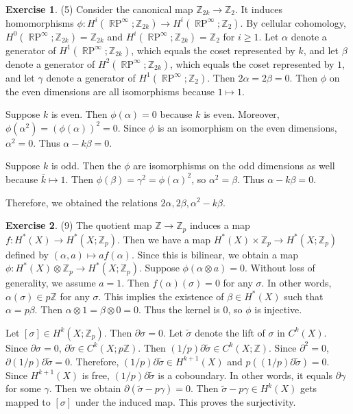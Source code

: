 \documentclass[12pt, psamsfonts]{amsart}
\theoremstyle{definition}
\newtheorem*{exer}{Exercise}
\theoremstyle{remark}
\DeclareMathOperator{\RP}{\mathbb{R}P}
\numberwithin{equation}{section}
\begin{document}
\begin{exer}{(5)}
  Consider the canonical map $\mathbb{Z}_{2k} \rightarrow \mathbb{Z}_2$.
  It induces homomorphisms $\phi: H^i(\RP^{\infty};\mathbb{Z}_{2k}) \rightarrow H^i(\RP^{\infty};\mathbb{Z}_{2})$.
  By cellular cohomology, $H^0(\RP^{\infty}; \mathbb{Z}_{2k}) = \mathbb{Z}_{2k}$ and $H^i(\RP^{\infty}; \mathbb{Z}_{2k}) = \mathbb{Z}_2$ for $i \geq 1$.
  Let $\alpha$ denote a generator of $H^1(\RP^{\infty};\mathbb{Z}_{2k})$, which equals the coset represented by $k$, and let $\beta$ denote a generator of $H^2(\RP^{\infty}; \mathbb{Z}_{2k})$, which equals the coset represented by $1$, and let $\gamma$ denote a generator of $H^1(\RP^{\infty}; \mathbb{Z}_2)$.
  Then $2\alpha = 2\beta = 0$.
  Then $\phi$ on the even dimensions are all isomorphisms because $1 \mapsto 1$.

  Suppose $k$ is even.
  Then $\phi(\alpha) = 0$ because $k$ is even.
  Moreover, $\phi(\alpha^2) = (\phi(\alpha))^2 = 0$.
  Since $\phi$ is an isomorphism on the even dimensions, $\alpha^2 = 0$.
  Thus $\alpha - k\beta = 0$.

  Suppose $k$ is odd.
  Then the $\phi$ are isomorphisms on the odd dimensions as well because $\overline{k} \mapsto 1$.
  Then $\phi(\beta) = \gamma^2 = \phi(\alpha)^2$, so $\alpha^2 = \beta$.
  Thus $\alpha - k\beta = 0$.

  Therefore, we obtained the relations $2\alpha, 2\beta, \alpha^2 - k\beta$.
\end{exer}

\begin{exer}{(9)}
  The quotient map $\mathbb{Z} \rightarrow \mathbb{Z}_p$ induces a map $f: H^{\ast}(X) \rightarrow H^{\ast}(X; \mathbb{Z}_p)$.
  Then we have a map $H^{\ast}(X) \times \mathbb{Z}_p \rightarrow H^{\ast}(X; \mathbb{Z}_p)$ defined by $(\alpha, a) \mapsto af(\alpha)$.
  Since this is bilinear, we obtain a map $\phi: H^{\ast}(X) \otimes \mathbb{Z}_p \rightarrow H^{\ast}(X; \mathbb{Z}_p)$.
  Suppose $\phi(\alpha \otimes a) = 0$.
  Without loss of generality, we assume $a = 1$.
  Then $f(\alpha)(\sigma) = 0$ for any $\sigma$.
  In other words, $\alpha(\sigma) \in p\mathbb{Z}$ for any $\sigma$.
  This implies the existence of $\beta \in H^{\ast}(X)$ such that $\alpha = p\beta$.
  Then $\alpha \otimes 1 = \beta \otimes 0 = 0$.
  Thus the kernel is 0, so $\phi$ is injective.

  Let $[\sigma] \in H^k(X; \mathbb{Z}_p)$.
  Then $\partial\sigma = 0$.
  Let $\tilde{\sigma}$ denote the lift of $\sigma$ in $C^k(X)$.
  Since $\partial\sigma = 0$, $\partial\tilde{\sigma} \in C^k(X; p\mathbb{Z})$.
  Then $(1/p)\partial\tilde{\sigma} \in C^k(X; \mathbb{Z})$.
  Since $\partial^2 = 0$, $\partial (1/p)\partial\tilde{\sigma} = 0$.
  Therefore, $(1/p)\partial\tilde{\sigma} \in H^{k + 1}(X)$ and $p((1/p)\partial\tilde{\sigma}) = 0$.
  Since $H^{k + 1}(X)$ is free, $(1/p)\partial\tilde{\sigma}$ is a coboundary.
  In other words, it equals $\partial \gamma$ for some $\gamma$.
  Then we obtain $\partial(\tilde{\sigma} - p\gamma) = 0$.
  Then $\tilde{\sigma} - p\gamma \in H^k(X)$ gets mapped to $[\sigma]$ under the induced map.
  This proves the surjectivity.
\end{exer}
\end{document}
